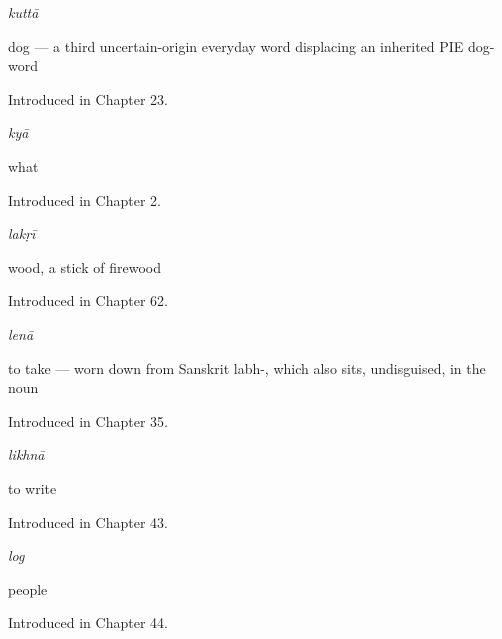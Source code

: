 \noindent\begin{minipage}[t]{\linewidth}
\raggedright
\textbf{}\enspace\emph{kuttā}\par
\small dog — a third uncertain-origin everyday word displacing an inherited PIE dog-word\par
\footnotesize Introduced in Chapter 23.
\end{minipage}\par\medskip

\noindent\begin{minipage}[t]{\linewidth}
\raggedright
\textbf{}\enspace\emph{kyā}\par
\small what\par
\footnotesize Introduced in Chapter 2.
\end{minipage}\par\medskip

\noindent\begin{minipage}[t]{\linewidth}
\raggedright
\textbf{}\enspace\emph{lakṛī}\par
\small wood, a stick of firewood\par
\footnotesize Introduced in Chapter 62.
\end{minipage}\par\medskip

\noindent\begin{minipage}[t]{\linewidth}
\raggedright
\textbf{}\enspace\emph{lenā}\par
\small to take — worn down from Sanskrit labh-, which also sits, undisguised, in the noun \par
\footnotesize Introduced in Chapter 35.
\end{minipage}\par\medskip

\noindent\begin{minipage}[t]{\linewidth}
\raggedright
\textbf{}\enspace\emph{likhnā}\par
\small to write\par
\footnotesize Introduced in Chapter 43.
\end{minipage}\par\medskip

\noindent\begin{minipage}[t]{\linewidth}
\raggedright
\textbf{}\enspace\emph{log}\par
\small people\par
\footnotesize Introduced in Chapter 44.
\end{minipage}\par\medskip


